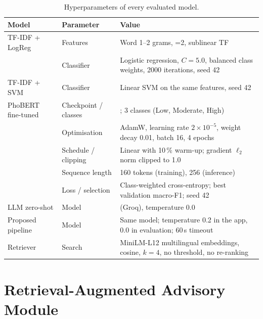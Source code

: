 \begin{table}[ht]
	\centering
	\caption{Hyperparameters of every evaluated model.}
	\label{tab:hyper}
	\begin{tabularx}{\textwidth}{llL}
		\toprule
		Model                    & Parameter           & Value \\ \midrule
		TF-IDF + LogReg          & Features            & Word 1--2 grams, =2, sublinear TF \\
		                         & Classifier          & Logistic regression, $C=5.0$, balanced class weights, 2000 iterations, seed 42 \\
		TF-IDF + SVM             & Classifier          & Linear SVM on the same features, seed 42 \\
		PhoBERT fine-tuned       & Checkpoint / classes & ; 3 classes (Low, Moderate, High) \\
		                         & Optimisation        & AdamW, learning rate $2\times10^{-5}$, weight decay 0.01, batch 16, 4 epochs \\
		                         & Schedule / clipping & Linear with 10\,\% warm-up; gradient $\ell_2$ norm clipped to 1.0 \\
		                         & Sequence length     & 160 tokens (training), 256 (inference) \\
		                         & Loss / selection    & Class-weighted cross-entropy; best validation macro-F1; seed 42 \\
		LLM zero-shot            & Model               &  (Groq), temperature 0.0 \\
		Proposed pipeline        & Model               & Same model; temperature 0.2 in the app, 0.0 in evaluation; 60\,s timeout \\
		Retriever                & Search              & MiniLM-L12 multilingual embeddings, cosine, $k=4$, no threshold, no re-ranking \\ \bottomrule
	\end{tabularx}
\end{table}

\section{Retrieval-Augmented Advisory Module}
